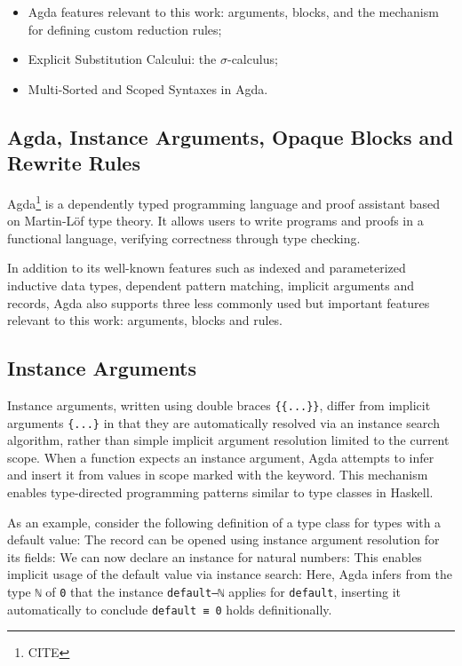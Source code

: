 \documentclass[screen,nonacm]{acmart}
\begin{document}
\begin{itemize}
      \item Agda features relevant to this work:  arguments,
             blocks, and the  mechanism for
            defining custom reduction rules;
      \item Explicit Substitution Calcului: the $\sigma$-calculus;
      \item Multi-Sorted and Scoped Syntaxes in Agda.
\end{itemize}

\subsection{Agda, Instance Arguments, Opaque Blocks and Rewrite
      Rules}\label{sec:pre-agd} Agda\footnote{CITE} is a dependently typed programming language and proof
assistant based on Martin-Löf type theory. It allows users to write programs
and proofs in a functional language, verifying correctness through type
checking.

In addition to its well-known features such as indexed and parameterized
inductive data types, dependent pattern matching, implicit arguments and
records, Agda also supports three less commonly used but important features
relevant to this work:  arguments, 
blocks and  rules.

\subsection*{Instance Arguments}

Instance arguments, written using double braces \verb|{{...}}|, differ from
implicit arguments \verb|{...}| in that they are automatically resolved via an
instance search algorithm, rather than simple implicit argument resolution
limited to the current scope. When a function expects an instance argument,
Agda attempts to infer and insert it from values in scope marked with the
 keyword. This mechanism enables type-directed
programming patterns similar to type classes in Haskell.

As an example, consider the following definition of a type class for types with
a default value: \EDefault{} The record can be opened using instance argument
resolution for its fields: \EDefFields{} We can now declare an instance for
natural numbers: \EDefInst{} This enables implicit usage of the default value
via instance search: \EDefEx{} Here, Agda infers from the type \verb|ℕ| of
\verb|0| that the instance \verb|default–ℕ| applies for \verb|default|,
inserting it automatically to conclude \verb|default ≡ 0| holds definitionally.
\end{document}
